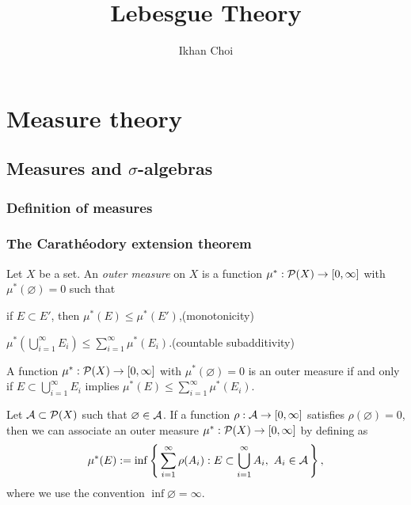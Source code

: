 \documentclass{../note}
\begin{document}
\title{Lebesgue Theory}
\author{Ikhan Choi}
\maketitle
\tableofcontents

\part{Measure theory}



\chapter{Measures and $\sigma$-algebras}

\section{Definition of measures}

\section{The Carath\'eodory extension theorem}
\begin{prb}
Let $X$ be a set.
An \emph{outer measure} on $X$ is a function $\mu^*:\mathcal{P}(X)\to[0,\infty]$ with $\mu^*(\varnothing)=0$ such that
\begin{parts}[(i)]
\item if $E\subset E'$, then $\mu^*(E)\le\mu^*(E')$,\hfill(monotonicity)
\item $\mu^*(\bigcup_{i=1}^\infty E_i)\le\sum_{i=1}^\infty\mu^*(E_i)$.\hfill(countable subadditivity)
\end{parts}

\begin{parts}
\item A function $\mu^*:\mathcal{P}(X)\to[0,\infty]$ with $\mu^*(\varnothing)=0$ is an outer measure if and only if $E\subset\bigcup_{i=1}^\infty E_i$ implies $\mu^*(E)\le\sum_{i=1}^\infty\mu^*(E_i)$.
\item
Let $\mathcal{A}\subset\mathcal{P}(X)$ such that $\varnothing\in\mathcal{A}$.
If a function $\rho:\mathcal{A}\to[0,\infty]$ satisfies $\rho(\varnothing)=0$, then we can associate an outer measure $\mu^*:\mathcal{P}(X)\to[0,\infty]$ by defining as
\[\mu^*(E):=\inf\left\{\,\sum_{i=1}^\infty\rho(A_i):E\subset\bigcup_{i=1}^\infty A_i,\ A_i\in\mathcal{A}\,\right\},\]
where we use the convention $\inf\varnothing=\infty$.
\end{parts}
\end{prb}
\end{document}
